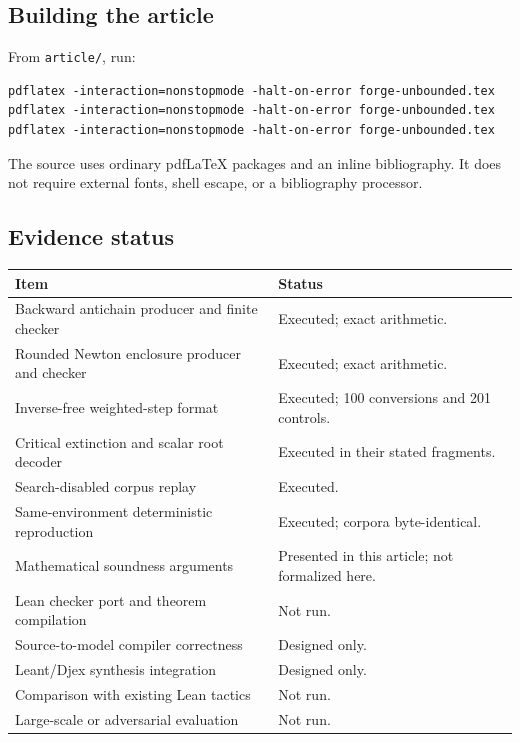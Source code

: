 \documentclass[11pt,a4paper]{article}
\theoremstyle{definition}\newtheorem{definition}[theorem]{Definition}
\theoremstyle{remark}\newtheorem{remark}[theorem]{Remark}
\newcommand{\code}[1]{\nolinkurl{#1}}
\begin{document}
\subsection{Building the article}
From \code{article/}, run:
\begin{lstlisting}
pdflatex -interaction=nonstopmode -halt-on-error forge-unbounded.tex
pdflatex -interaction=nonstopmode -halt-on-error forge-unbounded.tex
pdflatex -interaction=nonstopmode -halt-on-error forge-unbounded.tex
\end{lstlisting}
The source uses ordinary pdfLaTeX packages and an inline bibliography. It does not require external fonts, shell escape, or a bibliography processor.

\subsection{Evidence status}
\begin{longtable}{P{0.43\textwidth}P{0.47\textwidth}}
\toprule
Item & Status \\
\midrule
Backward antichain producer and finite checker & Executed; exact arithmetic.\\
Rounded Newton enclosure producer and checker & Executed; exact arithmetic.\\
Inverse-free weighted-step format & Executed; 100 conversions and 201 controls.\\
Critical extinction and scalar root decoder & Executed in their stated fragments.\\
Search-disabled corpus replay & Executed.\\
Same-environment deterministic reproduction & Executed; corpora byte-identical.\\
Mathematical soundness arguments & Presented in this article; not formalized here.\\
Lean checker port and theorem compilation & Not run.\\
Source-to-model compiler correctness & Designed only.\\
Leant/Djex synthesis integration & Designed only.\\
Comparison with existing Lean tactics & Not run.\\
Large-scale or adversarial evaluation & Not run.\\
\bottomrule
\end{longtable}

\end{document}
